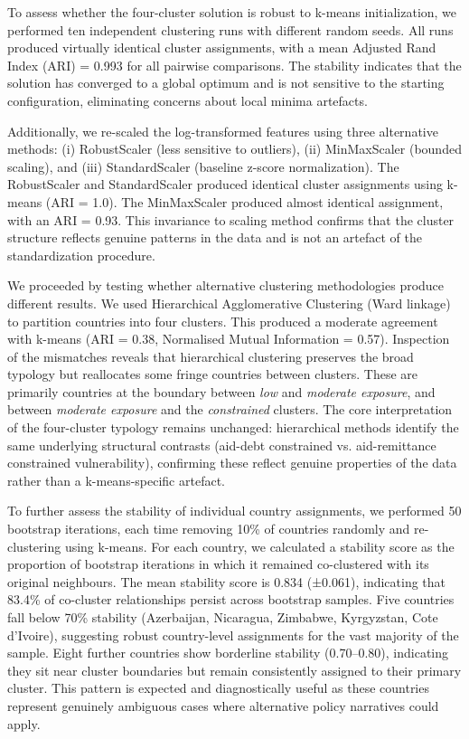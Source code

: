 \documentclass[fleqn,10pt,twocolumn]{wlscirep}
\begin{document}
{
	To assess whether the four-cluster solution is robust to k-means initialization, we performed ten independent clustering runs with different random seeds. All runs produced virtually identical cluster assignments, with a mean Adjusted Rand Index (ARI) = 0.993 for all pairwise comparisons. The stability indicates that the solution has converged to a global optimum and is not sensitive to the starting configuration, eliminating concerns about local minima artefacts.
	
	Additionally, we re-scaled the log-transformed features using three alternative methods: (i) RobustScaler (less sensitive to outliers), (ii) MinMaxScaler (bounded scaling), and (iii) StandardScaler (baseline z-score normalization). The RobustScaler and StandardScaler produced identical cluster assignments using k-means (ARI = 1.0). The MinMaxScaler produced almost identical assignment, with an ARI = 0.93. This invariance to scaling method confirms that the cluster structure reflects genuine patterns in the data and is not an artefact of the standardization procedure.
	
	We proceeded by testing whether alternative clustering methodologies produce different results. We used Hierarchical Agglomerative Clustering (Ward linkage) to partition countries into four clusters. This produced a moderate agreement with k-means (ARI = 0.38, Normalised Mutual Information = 0.57). Inspection of the mismatches reveals that hierarchical clustering preserves the broad typology but reallocates some fringe countries between clusters. These are primarily countries at the boundary between \textit{low} and \textit{moderate exposure}, and between \textit{moderate exposure} and the \textit{constrained} clusters. The core interpretation of the four-cluster typology remains unchanged: hierarchical methods identify the same underlying structural contrasts (aid-debt constrained vs. aid-remittance constrained vulnerability), confirming these reflect genuine properties of the data rather than a k-means-specific artefact.
	
	To further assess the stability of individual country assignments, we performed 50 bootstrap iterations, each time removing 10\% of countries randomly and re-clustering using k-means. For each country, we calculated a stability score as the proportion of bootstrap iterations in which it remained co-clustered with its original neighbours. The mean stability score is 0.834 (±0.061), indicating that 83.4\% of co-cluster relationships persist across bootstrap samples. Five countries fall below 70\% stability (Azerbaijan, Nicaragua, Zimbabwe, Kyrgyzstan, Cote d'Ivoire), suggesting robust country-level assignments for the vast majority of the sample. Eight further countries show borderline stability (0.70–0.80), indicating they sit near cluster boundaries but remain consistently assigned to their primary cluster. This pattern is expected and diagnostically useful as these countries represent genuinely ambiguous cases where alternative policy narratives could apply.
	
}
\end{document}
